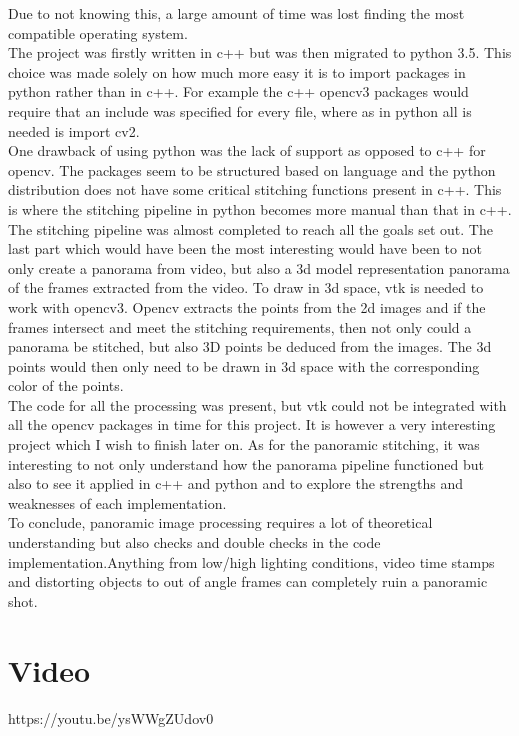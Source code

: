 \documentclass{article}
\begin{document}
Due to not knowing this, a large amount of time was lost finding the most compatible operating system.\\
The project was firstly written in c++ but was then migrated to python 3.5. This choice was made solely on how much more easy it is to import packages in python rather than in c++. For example the c++ opencv3 packages would require that an include was specified for every file, where as in python all is needed is import cv2.\\
One drawback of using python was the lack of support as opposed to c++ for opencv. The packages seem to be structured based on language and the python distribution does not have some critical stitching functions present in c++. This is where the stitching pipeline in python becomes more manual than that in c++.\\

The stitching pipeline was almost completed to reach all the goals set out. The last part which would have been the most interesting would have been to not only create a panorama from video, but also a 3d model representation panorama of the frames extracted from the video. To draw in 3d space, vtk is needed to work with opencv3. Opencv extracts the points from the 2d images and if the frames intersect and meet the stitching requirements, then not only could a panorama be stitched, but also 3D points be deduced from the images. The 3d points would then only need to be drawn in 3d space with the corresponding color of the points.\\




The code for all the processing was present, but vtk could not be integrated with all the opencv packages in time for this project. It is however a very interesting project which I wish to finish later on. 
As for the panoramic stitching, it was interesting to not only understand how the panorama pipeline functioned but also to see it applied in c++ and python and to explore the strengths and weaknesses of each implementation. \\
To conclude, panoramic image processing requires a lot of theoretical understanding but also checks and double checks in the code implementation.Anything from low/high lighting conditions, video time stamps and distorting objects to out of angle frames can completely ruin a panoramic shot.


\section{Video}\label{sec:overview}
https://youtu.be/ysWWgZUdov0



\cleardoublepage


\end{document}
